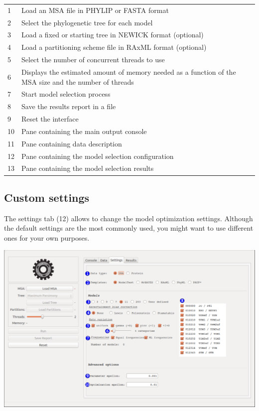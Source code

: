 \documentclass[10pt,twoside,a4paper]{article}
\begin{document}
\begin{tabular}{l p{}}
  \color{ForestGreen}1 & Load an MSA file in PHYLIP or FASTA format \\
  \color{ForestGreen}2 & Select the phylogenetic tree for each model \\
  \color{ForestGreen}3 & Load a fixed or starting tree in NEWICK format (optional) \\
  \color{ForestGreen}4 & Load a partitioning scheme file in RAxML format (optional) \\
  \color{ForestGreen}5 & Select the number of concurrent threads to use \\
  \color{ForestGreen}6 & Displays the estimated amount of memory needed as a function of the MSA size and the number of threads \\
  \hline
  \color{ForestGreen}7 & Start model selection process \\
  \color{ForestGreen}8 & Save the results report in a file \\
  \color{ForestGreen}9 & Reset the interface \\
  \hline
  \color{RedOrange}10 & Pane containing the main output console \\
  \color{RedOrange}11 & Pane containing data description \\
  \color{RedOrange}12 & Pane containing the model selection configuration \\
  \color{RedOrange}13 & Pane containing the model selection results \\
\end{tabular}

\subsection{Custom settings}

The settings tab ({\color{RedOrange}12}) allows to change the model optimization settings.
Although the default settings are the most commonly used, you might want to use different ones for your own purposes.

\begin{center}
\includegraphics[width=.9\textwidth]{images/lkl-settings}
\end{center}
\end{document}
